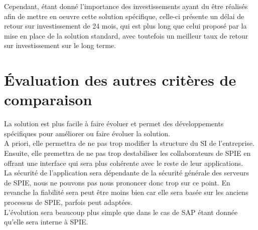 Cependant, étant donné l’importance des investissements ayant du être réalisés afin de mettre en oeuvre cette solution spécifique, celle-ci présente un délai de retour sur investissement de 24 mois, qui est plus long que celui proposé par la mise en place de la solution standard, avec toutefois un meilleur taux de retour sur investissement sur le long terme.

\section{Évaluation des autres critères de comparaison}

La solution est plus facile à faire évoluer et permet des développements spécifiques pour améliorer ou faire évoluer la solution. \\

A priori, elle permettra de ne pas trop modifier la structure du SI de l’entreprise. Ensuite, elle premettra de ne pas trop destabiliser les collaborateurs de SPIE en offrant une interface qui sera plus cohérente avec le reste de leur applications. \\

La sécurité de l’application sera dépendante de la sécurité générale des serveurs de SPIE, nous ne pouvons pas nous prononcer donc trop sur ce point. En revanche la fiabilité sera peut être moins bien car elle sera basée sur les anciens processus de SPIE, parfois peut adaptées. \\

L’évolution sera beaucoup plus simple que dans le cas de SAP étant donnée qu’elle sera interne à SPIE.